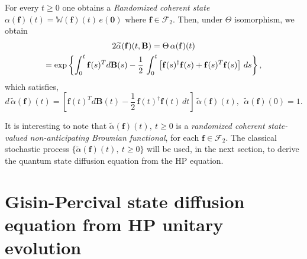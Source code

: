 \begin{remark}
For every  $t\geq 0$ one obtains a {\em Randomized coherent state} 
$\alpha(\mathbf{f})(t)=\mathbb{W}(\mathbf{f})(t)\, e(\mathbf{0})$ where $\mathbf{f}\in\mathcal{F}_2$. Then, under $\Theta$ isomorphism, we obtain 
\begin{multline}{2} 
\widetilde{\alpha}(\mathbf{f})(t,\mathbf{B})= \Theta\, \alpha(\mathbf{f})(t) \\ 
= {\rm exp}\left\{\int_0^t \mathbf{f}(s)^T d\mathbf{B}(s)-\frac{1}{2}\,\int_0^t\left[\mathbf{f}(s)^\dag \mathbf{f}(s) +\mathbf{f}(s)^T \mathbf{f}(s)\right]\, ds\right\}, \label{chap5-eq5.18}
\end{multline}  
which satisfies,   
\begin{equation}
d\,\widetilde{\alpha}(\mathbf{f})(t)=[\mathbf{f}(t)^T d\mathbf{B}(t)-\frac{1}{2}\,\mathbf{f}(t)^\dag \mathbf{f}(t)\,  dt]\, \widetilde{\alpha}(\mathbf{f})(t),\ \ \widetilde{\alpha}(\mathbf{f})(0)=1. \label{chap5-eq5.19}
\end{equation}
\end{remark}
It is interesting to note that $\widetilde{\alpha}(\mathbf{f})(t),\ t\geq 0$ is a {\em randomized coherent state-valued non-anticipating Brownian functional}, for each $\mathbf{f}\in \mathcal{F}_2$. The classical stochastic process $\{\widetilde{\alpha}(\mathbf{f})(t),\ t\geq 0\}$  will be used, in the next section, to derive  the quantum state diffusion equation  from the HP equation. 

\section{Gisin-Percival state diffusion equation from  HP unitary evolution} \label{chap5-sec6}

